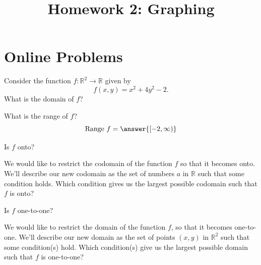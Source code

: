 \documentclass{ximera}
\title{Homework 2: Graphing}
\begin{document}
\begin{abstract}
\end{abstract}
\maketitle
\section*{Online Problems}
\begin{problem}
Consider the function $f:\mathbb{R}^2\rightarrow\mathbb{R}$ given by
\[
f(x,y) = x^2+4y^2 -2.
\]
What is the domain of $f$?
\begin{multipleChoice}
\choice{$[0,\infty)$}
\end{multipleChoice}

What is the range of $f$?
\[
\textrm{Range }f = \answer{[-2,\infty)}
\]

Is $f$ onto?
\begin{multipleChoice}
\end{multipleChoice}

\begin{problem}
We would like to restrict the codomain of the function $f$ so that it becomes onto. We'll describe our new codomain as the set of numbers $a$ in $\mathbb{R}$ such that some condition holds. Which condition gives us the largest possible codomain such that $f$ is onto?
\begin{multipleChoice}
\end{multipleChoice}
\end{problem}

Is $f$ one-to-one?
\begin{multipleChoice}
\end{multipleChoice}

\begin{problem}
We would like to restrict the domain of the function $f$, so that it becomes one-to-one. We'll describe our new domain as the set of points $(x,y)$ in $\mathbb{R}^2$ such that some condition(s) hold. Which condition(s) give us the largest possible domain such that $f$ is one-to-one?
\begin{selectAll}
\end{selectAll}
\end{problem}
\end{problem}
\end{document}
